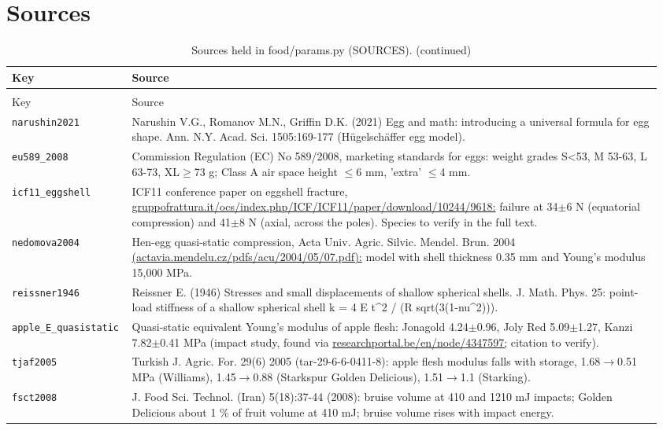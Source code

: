 \documentclass[10.5pt,a4paper]{article}
\begin{document}
\section{Sources}
{\scriptsize\begin{longtable}{@{}p{0.16\linewidth}p{0.8\linewidth}@{}}\caption{Sources held in food/params.py (SOURCES).}\\\toprule Key & Source \\\midrule\endfirsthead
\caption[]{Sources held in food/params.py (SOURCES). (continued)}\\\toprule Key & Source \\\midrule\endhead
\texttt{narushin2021} & Narushin V.G., Romanov M.N., Griffin D.K. (2021) Egg and math: introducing a universal formula for egg shape. Ann. N.Y. Acad. Sci. 1505:169-177 (Hügelschäffer egg model). \\
\texttt{eu589\_\allowbreak{}2008} & Commission Regulation (EC) No 589/2008, marketing standards for eggs: weight grades S<53, M 53-63, L 63-73, XL$\ge$73 g; Class A air space height $\le$6 mm, 'extra' $\le$4 mm. \\
\texttt{icf11\_\allowbreak{}eggshell} & ICF11 conference paper on eggshell fracture, \url{gruppofrattura.it/ocs/index.php/ICF/ICF11/paper/download/10244/9618:} failure at 34$\pm$6 N (equatorial compression) and 41$\pm$8 N (axial, across the poles). Species to verify in the full text. \\
\texttt{nedomova2004} & Hen-egg quasi-static compression, Acta Univ. Agric. Silvic. Mendel. Brun. 2004 \url{(actavia.mendelu.cz/pdfs/acu/2004/05/07.pdf):} model with shell thickness 0.35 mm and Young's modulus 15,000 MPa. \\
\texttt{reissner1946} & Reissner E. (1946) Stresses and small displacements of shallow spherical shells. J. Math. Phys. 25: point-load stiffness of a shallow spherical shell k = 4 E t\^{}2 / (R sqrt(3(1-nu\^{}2))). \\
\texttt{apple\_\allowbreak{}E\_\allowbreak{}quasistatic} & Quasi-static equivalent Young's modulus of apple flesh: Jonagold 4.24$\pm$0.96, Joly Red 5.09$\pm$1.27, Kanzi 7.82$\pm$0.41 MPa (impact study, found via \url{researchportal.be/en/node/4347597;} citation to verify). \\
\texttt{tjaf2005} & Turkish J. Agric. For. 29(6) 2005 (tar-29-6-6-0411-8): apple flesh modulus falls with storage, 1.68$\to$0.51 MPa (Williams), 1.45$\to$0.88 (Starkspur Golden Delicious), 1.51$\to$1.1 (Starking). \\
\texttt{fsct2008} & J. Food Sci. Technol. (Iran) 5(18):37-44 (2008): bruise volume at 410 and 1210 mJ impacts; Golden Delicious about 1 \% of fruit volume at 410 mJ; bruise volume rises with impact energy. \\

\end{longtable}}
\end{document}
